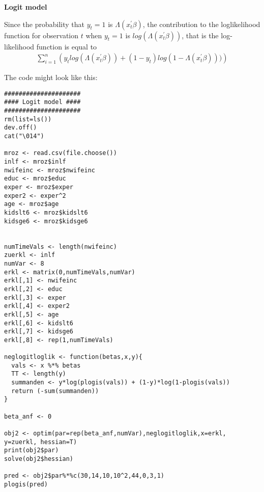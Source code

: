 \begin{Solution}{12.7}
\textbf{Logit model}

Since the probability that $y_t=1$ is $\Lambda \left( x_{t}^{\prime }\beta \right)$, the contribution to the loglikelihood function for observation $t$ when $y_t=1$ is $log(\Lambda \left( x_{t}^{\prime }\beta \right))$, that is the log-likelihood function is equal to
\begin{align*}
\sum_{i=1}^{n} \left(y_t log(\Lambda \left( x_{t}^{\prime }\beta \right)) + (1-y_t)log(1-\Lambda \left( x_{t}^{\prime }\beta \right)))\right)
\end{align*}

The code might look like this:
\begin{verbatim}
#####################
#### Logit model ####
#####################
rm(list=ls())
dev.off()
cat("\014")

mroz <- read.csv(file.choose())
inlf <- mroz$inlf
nwifeinc <- mroz$nwifeinc
educ <- mroz$educ
exper <- mroz$exper
exper2 <- exper^2
age <- mroz$age
kidslt6 <- mroz$kidslt6
kidsge6 <- mroz$kidsge6


numTimeVals <- length(nwifeinc)
zuerkl <- inlf
numVar <- 8
erkl <- matrix(0,numTimeVals,numVar)
erkl[,1] <- nwifeinc
erkl[,2] <- educ
erkl[,3] <- exper
erkl[,4] <- exper2
erkl[,5] <- age
erkl[,6] <- kidslt6
erkl[,7] <- kidsge6
erkl[,8] <- rep(1,numTimeVals)

neglogitloglik <- function(betas,x,y){
  vals <- x %*% betas
  TT <- length(y)
  summanden <- y*log(plogis(vals)) + (1-y)*log(1-plogis(vals))
  return (-sum(summanden))
}

beta_anf <- 0

obj2 <- optim(par=rep(beta_anf,numVar),neglogitloglik,x=erkl, y=zuerkl, hessian=T)
print(obj2$par)
solve(obj2$hessian)

pred <- obj2$par%*%c(30,14,10,10^2,44,0,3,1)
plogis(pred)


\end{verbatim}
\end{Solution}
